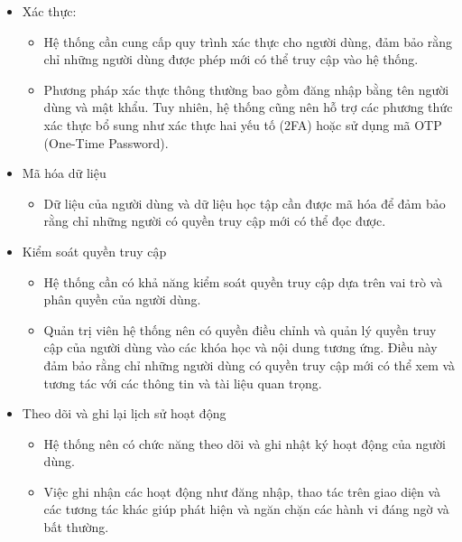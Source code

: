 \documentclass[../Thesis.tex]{subfiles}
\begin{document}
            \begin{itemize}
                \item Xác thực:
                    \begin{itemize}
                        \item Hệ thống cần cung cấp quy trình xác thực cho người dùng, đảm bảo rằng chỉ những người dùng được phép mới có thể truy cập vào hệ thống.
                        \item Phương pháp xác thực thông thường bao gồm đăng nhập bằng tên người dùng và mật khẩu. Tuy nhiên, hệ thống cũng nên hỗ trợ các phương thức xác thực bổ sung như xác thực hai yếu tố (2FA) hoặc sử dụng mã OTP (One-Time Password).
                    \end{itemize}

                \item Mã hóa dữ liệu
                    \begin{itemize}
                        \item Dữ liệu của người dùng và dữ liệu học tập cần được mã hóa để đảm bảo rằng chỉ những người có quyền truy cập mới có thể đọc được.
                    \end{itemize}

                \item Kiểm soát quyền truy cập
                \begin{itemize}
                    \item Hệ thống cần có khả năng kiểm soát quyền truy cập dựa trên vai trò và phân quyền của người dùng.
                    
                    \item Quản trị viên hệ thống nên có quyền điều chỉnh và quản lý quyền truy cập của người dùng vào các khóa học và nội dung tương ứng. Điều này đảm bảo rằng chỉ những người dùng có quyền truy cập mới có thể xem và tương tác với các thông tin và tài liệu quan trọng.
                \end{itemize}

                \item Theo dõi và ghi lại lịch sử hoạt động
                \begin{itemize}
                    \item Hệ thống nên có chức năng theo dõi và ghi nhật ký hoạt động của người dùng.
                    
                    \item Việc ghi nhận các hoạt động như đăng nhập, thao tác trên giao diện và các tương tác khác giúp phát hiện và ngăn chặn các hành vi đáng ngờ và bất thường.
                \end{itemize}
            \end{itemize}
\end{document}

